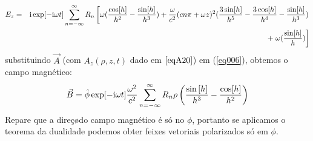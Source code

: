 \begin{align}
\nonumber E_z&=& {\rm i}\exp[-{\rm i}\omega t]\sum\limits_{n=-\infty}^{\infty}R_n\left[\omega (\frac{\cos[h]}{h^2}-\frac{\sin[h]}{h^3})+\frac{\omega}{c^2} (c n \pi +\omega z)^2(\frac{3 \sin[h]}{h^5}-\frac{3\cos[h]}{h^4}-\frac{ \sin[h]}{h^3})\right.\\
 & & + \left.\omega (\frac{\sin[h]}{h} )\right]\label{eq0021}
\end{align}
substituindo $\vec{A}$ (com $A_z(\rho,z,t)$ dado em $\ref{eqA20}$) em (\ref{eq006}), obtemos o campo magn\'etico:
\begin{equation}\label{eq0022}
\vec{B}= \hat{\phi}\exp[-{\rm i}\omega t]\frac{\omega^2}{c^2}\sum\limits_{n=-\infty}^{\infty}R_n \rho \left(\frac{\sin\left[h\right]}{h^3}-\frac{\cos[h]}{h^2}\right)
\end{equation}
Repare que a dire\c{c}\o do campo magn\'etico \'e s\'o no $\phi$, portanto se aplicamos o teorema da dualidade \cite{Lya:21} podemos obter feixes vetoriais polarizados s\'o em $\phi$. 
